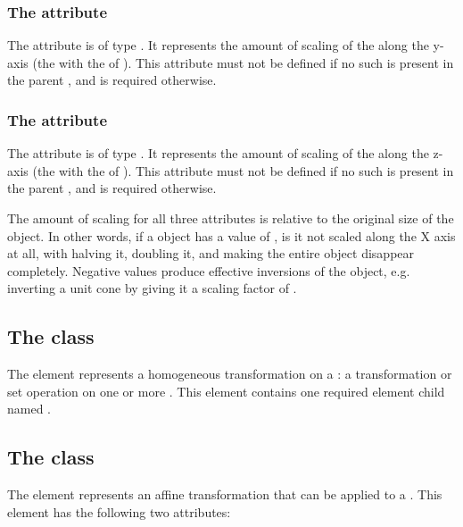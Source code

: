 \subsubsection{The \fixttspace{} attribute}
The  attribute is of type . It represents the amount of scaling of the \CSGNode along the y-axis (the \CoordinateComponent with the  of ).  This attribute must not be defined if no such \CoordinateComponent is present in the parent \Geometry, and is required otherwise.

\subsubsection{The \fixttspace{} attribute}
The  attribute is of type . It represents the amount of scaling of the \CSGNode along the z-axis (the \CoordinateComponent with the  of ).  This attribute must not be defined if no such \CoordinateComponent is present in the parent \Geometry, and is required otherwise.

The amount of scaling for all three attributes is relative to the original size of the object.  In other words, if a \CSGScale object has a  value of , is it not scaled along the X axis at all, with  halving it,  doubling it, and  making the entire object disappear completely.  Negative values produce effective inversions of the object, e.g. inverting a unit cone by giving it a  scaling factor of .


\subsection{The  class}
\label{csghomogeneoustransformation-class}
The \CSGHomogeneousTransformation element represents a homogeneous transformation on a \CSGNode: a transformation or set operation on one or more \CSGPrimitives. This element contains one required \TransformationComponent element child named .


\subsection{The  class}
\label{transformationcomponent-class}
The \TransformationComponent element represents an affine transformation that can be applied to a \CSGNode. This element has the following two attributes:

